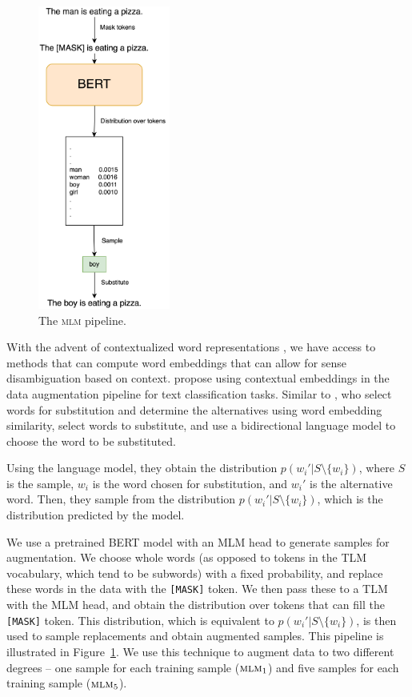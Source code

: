\documentclass[11pt,a4paper]{article}
\newcommand{\mlmone}{$\textsc{mlm}_1$}
\newcommand{\mlmfive}{$\textsc{mlm}_5$}
\begin{document}
\begin{figure}
    \centering
    \includegraphics[height=10cm]{figs/mlm.png}
    \caption{The \textsc{mlm} pipeline.}
    \label{fig:mlm}
\end{figure}

With the advent of contextualized word representations \cite{peters-etal-2018-deep,devlin2018bert}, we have access to methods that can compute word embeddings that can allow for sense disambiguation based on context. \citet{kobayashi-2018-contextual} propose using contextual embeddings in the data augmentation pipeline for text classification tasks. Similar to \citet{aug2prev}, who select words for substitution and determine the alternatives using word embedding similarity, \citet{kobayashi-2018-contextual} select words to substitute, and use a bidirectional language model to choose the word to be substituted. 

Using the language model, they obtain the distribution $p(w_i'|S \setminus \{w_i\})$, where $S$ is the sample, $w_i$ is the word chosen for substitution, and $w_i'$ is the alternative word. Then, they sample from the distribution $p(w_i'|S \setminus \{w_i\})$, which is the distribution predicted by the model.

We use a pretrained BERT model with an MLM head to generate samples for augmentation. We choose whole words (as opposed to tokens in the TLM vocabulary, which tend to be subwords) with a fixed probability, and replace these words in the data with the \texttt{[MASK]} token. We then pass these to a TLM with the MLM head, and obtain the distribution over tokens that can fill the \texttt{[MASK]} token. This distribution, which is equivalent to $p(w_i'|S \setminus \{w_i\})$, is then used to sample replacements and obtain augmented samples. This pipeline is illustrated in Figure~\ref{fig:mlm}. We use this technique to augment data to two different degrees -- one sample for each training sample (\mlmone) and five samples for each training sample (\mlmfive).
\end{document}
